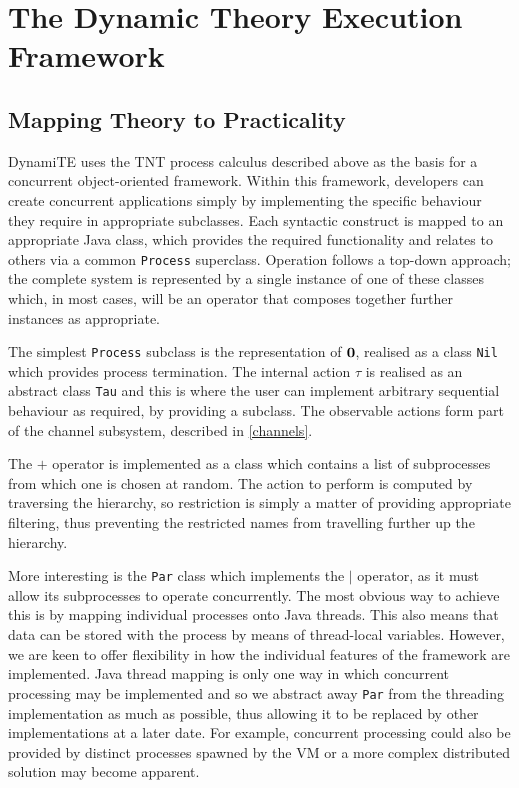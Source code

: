 
\chapter{The Dynamic Theory Execution Framework}
\label{dynamite}

\section{Mapping Theory to Practicality}
\label{dynamite}

DynamiTE uses the TNT process calculus described above as the basis for
a concurrent object-oriented framework.  Within this framework,
developers can create concurrent applications simply by implementing the
specific behaviour they require in appropriate subclasses.  Each
syntactic construct is mapped to an appropriate Java class, which
provides the required functionality and relates to others via a common
\texttt{Process} superclass.  Operation follows a top-down approach; the
complete system is represented by a single instance of one of these
classes which, in most cases, will be an operator that composes together
further instances as appropriate.

The simplest \texttt{Process} subclass is the representation of $\textbf{0}$,
realised as a class \texttt{Nil} which provides process termination.
The internal action $\tau$ is realised as an abstract class \texttt{Tau}
and this is where the user can implement arbitrary sequential behaviour
as required, by providing a subclass. The observable actions form part
of the channel subsystem, described in \ref{channels}.

The $+$ operator is implemented as a class which contains a list of
subprocesses from which one is chosen at random.  The action to perform
is computed by traversing the hierarchy, so restriction is simply a
matter of providing appropriate filtering, thus preventing the
restricted names from travelling further up the hierarchy.

More interesting is the \texttt{Par} class which implements the $\mid$
operator, as it must allow its subprocesses to operate concurrently.
The most obvious way to achieve this is by mapping individual processes
onto Java threads.  This also means that data can be stored with the
process by means of thread-local variables.  However, we are keen to
offer flexibility in how the individual features of the framework are
implemented.  Java thread mapping is only one way in which concurrent
processing may be implemented and so we abstract away \texttt{Par} from
the threading implementation as much as possible, thus allowing it to be
replaced by other implementations at a later date.  For example,
concurrent processing could also be provided by distinct processes
spawned by the VM or a more complex distributed solution may become
apparent.

